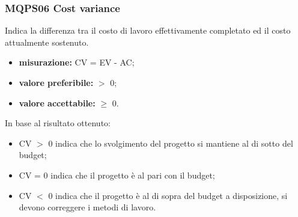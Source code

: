 \subsubsection{MQPS06 Cost variance}\label{2.1.3.6}
Indica la differenza tra il costo di lavoro effettivamente completato ed il costo attualmente sostenuto.
\begin{itemize}
	\item \textbf{misurazione:} CV = EV - AC;
	\item \textbf{valore preferibile:} $>$ 0;
	\item \textbf{valore accettabile:} $\geq$ 0.
\end{itemize}
In base al risultato ottenuto:
\begin{itemize}
	\item CV $>$ 0 indica che lo svolgimento del progetto si mantiene al di sotto del budget;
	\item CV = 0 indica che il progetto è al pari con il budget;
	\item CV $<$ 0 indica che il progetto è al di sopra del budget a disposizione, si devono correggere i metodi di lavoro.
\end{itemize}